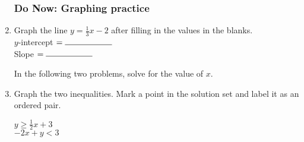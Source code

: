 \documentclass[12pt, oneside]{article}
\begin{document}
  \begin{enumerate}
    \subsubsection*{Do Now: Graphing practice}

        \item Graph the line $y=\frac{1}{3} x -2$ after filling in the values in the blanks.\\[0.85cm]
              $y$-intercept $= \rule{2cm}{0.15mm}$ \\[0.5cm]
              Slope $= \rule{2cm}{0.15mm}$\\

        \begin{center} %
        \end{center}

        In the following two problems, solve for the value of $x$.

\newpage
\item Graph the two inequalities. Mark a point in the solution set and label it as an ordered pair.

  \begin{multicols}{2}
    $y \geq \frac{1}{2} x +3$ \\
    $-2x+y < 3$
  \end{multicols} \vspace{2cm}
  \begin{center} %
  \end{center}


\end{enumerate}
\end{document}
